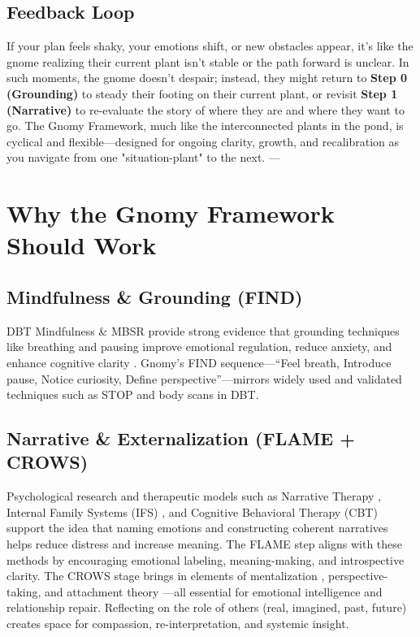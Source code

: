\documentclass{article}
\begin{document}
\subsection{Feedback Loop}
If your plan feels shaky, your emotions shift, or new obstacles appear, it's like the gnome realizing their current plant isn't stable or the path forward is unclear. In such moments, the gnome doesn't despair; instead, they might return to \textbf{Step 0 (Grounding)} to steady their footing on their current plant, or revisit \textbf{Step 1 (Narrative)} to re-evaluate the story of where they are and where they want to go. The Gnomy Framework, much like the interconnected plants in the pond, is cyclical and flexible—designed for ongoing clarity, growth, and recalibration as you navigate from one "situation-plant" to the next.
---

\section{Why the Gnomy Framework Should Work}

\subsection{Mindfulness \& Grounding (FIND)}
DBT Mindfulness \& MBSR provide strong evidence that grounding techniques like breathing and pausing improve emotional regulation, reduce anxiety, and enhance cognitive clarity \cite{linehan1993cognitive, kabat1990full}. Gnomy's FIND sequence—``Feel breath, Introduce pause, Notice curiosity, Define perspective''—mirrors widely used and validated techniques such as STOP and body scans in DBT.

\subsection{Narrative \& Externalization (FLAME + CROWS)}
Psychological research and therapeutic models such as Narrative Therapy \cite{white1990narrative}, Internal Family Systems (IFS) \cite{schwartz1995internal}, and Cognitive Behavioral Therapy (CBT) \cite{beck1979cognitive} support the idea that naming emotions and constructing coherent narratives helps reduce distress and increase meaning. The FLAME step aligns with these methods by encouraging emotional labeling, meaning-making, and introspective clarity. The CROWS stage brings in elements of mentalization \cite{fonagy2002affect}, perspective-taking, and attachment theory \cite{bowlby1969attachment}—all essential for emotional intelligence and relationship repair. Reflecting on the role of others (real, imagined, past, future) creates space for compassion, re-interpretation, and systemic insight.
\end{document}
